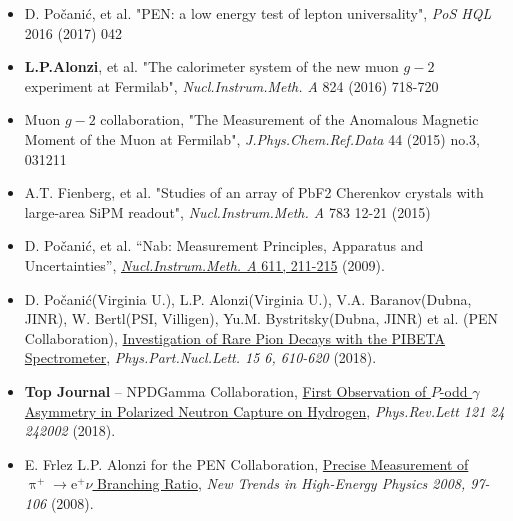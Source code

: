 \documentclass[10pt]{article}
\begin{document}
\begin{itemize}
\item D. Po\v{c}ani\'c, et al. "PEN: a low energy test of lepton universality", \emph{PoS HQL} 2016 (2017) 042
\item {\bf L.P.Alonzi}, et al. "The calorimeter system of the new muon $g-2$ experiment at Fermilab", \emph{Nucl.Instrum.Meth. A} 824 (2016) 718-720
\item Muon $g-2$ collaboration, "The Measurement of the Anomalous Magnetic Moment of the Muon at Fermilab", \emph{J.Phys.Chem.Ref.Data} 44 (2015) no.3, 031211
\item A.T. Fienberg, et al. "Studies of an array of PbF2 Cherenkov crystals with large-area SiPM readout", \emph{Nucl.Instrum.Meth. A} 783 12-21 (2015)
\item D. Po\v{c}ani\'c, et al. ``Nab: Measurement Principles, Apparatus and Uncertainties'', \href{http://www.sciencedirect.com/science?_ob=ArticleURL&_udi=B6TJM-4WY6JS6-B&_user=709071&_coverDate=12/11/2009&_rdoc=1&_fmt=high&_orig=search&_origin=search&_sort=d&_docanchor=&view=c&_searchStrId=1563612201&_rerunOrigin=google&_acct=C000039638&_version=1&_urlVersion=0&_userid=709071&md5=602265f8ed1e05dbcd605115545a0871&searchtype=a}{\emph{Nucl.Instrum.Meth. A} 611, 211-215} (2009).
\item D. Počanić(Virginia U.), L.P. Alonzi(Virginia U.), V.A. Baranov(Dubna, JINR), W. Bertl(PSI, Villigen), Yu.M. Bystritsky(Dubna, JINR) et al. (PEN Collaboration), \href{https://inspirehep.net/literature/1705214}{Investigation of Rare Pion Decays with the PIBETA Spectrometer}, \emph{Phys.Part.Nucl.Lett. 15 6, 610-620} (2018).
\item {\bf \LARGE Top Journal} -- NPDGamma Collaboration, \href{https://inspirehep.net/literature/1683923}{First Observation of $P$-odd $\gamma$ Asymmetry in Polarized Neutron Capture on Hydrogen}, \emph{Phys.Rev.Lett 121 24 242002} (2018).
\item E. Frlez L.P. Alonzi for the PEN Collaboration, \href{https://inspirehep.net/literature/805323}{Precise Measurement of $\uppi^{+}\rightarrow\mathrm{e}^{+}\nu$ Branching Ratio}, \emph{New Trends in High-Energy Physics 2008, 97-106} (2008).
\end{itemize}
\end{document}
